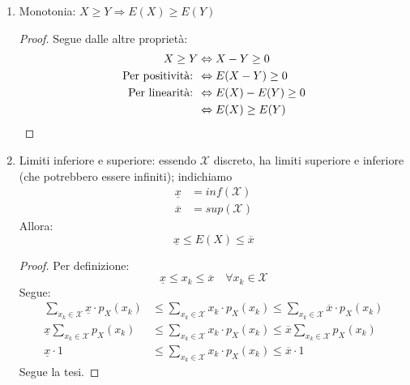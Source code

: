 \documentclass{article}
\theoremstyle{plain}
\theoremstyle{definition}
\theoremstyle{remark}
\begin{document}
\begin{enumerate}
\begin{proof}
		Per definizione:
		\begin{equation*}
			E(X)=\sum_{x_k\in\mathcal{X}} x_k\cdot p_X(x_k)
		\end{equation*}
		Per definizione:
		\begin{equation*}
			p_X(x_k)\geq0\quad\forall x_k\in\mathcal{X}
		\end{equation*}
		Per $Hp$:
		\begin{equation*}
			x_k\geq0\quad\forall x_k\in\mathcal{X}
		\end{equation*}
		Segue che i prodotti sono non negativi, e la sommatoria è a sua volta non negativa.
	\end{proof}
	\item Monotonia: $X\geq Y\Rightarrow E(X)\geq E(Y)$
	\begin{proof}
		Segue dalle altre proprietà:
		\begin{align*}
			X\geq Y&\Leftrightarrow X-Y\geq0\\
			\text{Per positività: }&\Leftrightarrow E(X-Y)\geq0\\
			\text{Per linearità: }&\Leftrightarrow E(X)-E(Y)\geq0\\
			&\Leftrightarrow E(X)\geq E(Y)\qedhere
		\end{align*}
	\end{proof}
	\item Limiti inferiore e superiore: essendo $\mathcal{X}$ discreto, ha limiti superiore e inferiore (che potrebbero essere infiniti); indichiamo
	\begin{align*}
		\underline{x}&=inf(\mathcal{X})\\
		\overline{x}&=sup(\mathcal{X})
	\end{align*}
	Allora:
	\begin{equation*}
		\underline{x}\leq E(X)\leq\overline{x}
	\end{equation*}
	\begin{proof}
		Per definizione:
		\begin{equation*}
			\underline{x}\leq x_k\leq\overline{x}\quad\forall x_k\in\mathcal{X}
		\end{equation*}
		Segue:
		\begin{align*}
			\sum_{x_k\in\mathcal{X}} \underline{x}\cdot p_X(x_k)&\leq\sum_{x_k\in\mathcal{X}} x_k\cdot p_X(x_k)\leq\sum_{x_k\in\mathcal{X}} \overline{x}\cdot p_X(x_k)\\
			\underline{x}\sum_{x_k\in\mathcal{X}} p_X(x_k)&\leq\sum_{x_k\in\mathcal{X}} x_k\cdot p_X(x_k)\leq\overline{x}\sum_{x_k\in\mathcal{X}} p_X(x_k)\\
			\underline{x}\cdot1&\leq\sum_{x_k\in\mathcal{X}} x_k\cdot p_X(x_k)\leq\overline{x}\cdot1
		\end{align*}
		Segue la tesi.
	\end{proof}
\end{enumerate}
\end{document}
